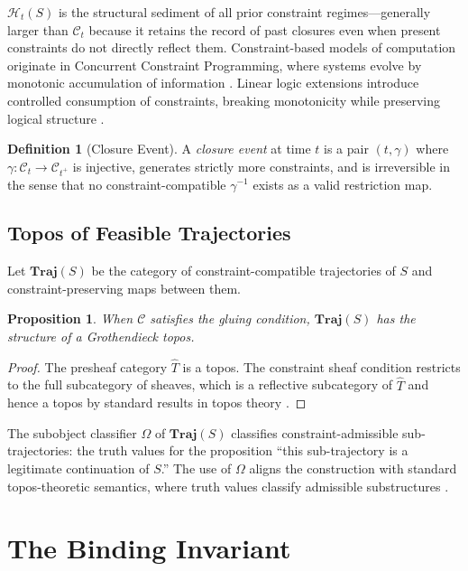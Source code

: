 \documentclass[11pt, letterpaper]{article}
\theoremstyle{plain}
\newtheorem{proposition}[theorem]{Proposition}
\theoremstyle{definition}
\newtheorem{definition}[theorem]{Definition}
\theoremstyle{remark}
\newcommand{\CC}{\mathcal{C}}
\newcommand{\HH}{\mathcal{H}}
\begin{document}
$\HH_t(S)$ is the structural sediment of all prior constraint regimes---generally
larger than $\CC_t$ because it retains the record of past closures even when present
constraints do not directly reflect them. Constraint-based models of computation
originate in Concurrent Constraint Programming, where systems evolve by monotonic
accumulation of information \cite{saraswat}. Linear logic extensions introduce
controlled consumption of constraints, breaking monotonicity while preserving logical
structure \cite{saraswatlincoln,girard}.

\begin{definition}[Closure Event]
A \emph{closure event} at time $t$ is a pair $(t, \gamma)$ where
$\gamma: \CC_t \to \CC_{t^+}$ is injective, generates strictly more constraints, and
is irreversible in the sense that no constraint-compatible $\gamma^{-1}$ exists as a
valid restriction map.
\end{definition}

\subsection{Topos of Feasible Trajectories}

Let $\mathbf{Traj}(S)$ be the category of constraint-compatible trajectories of $S$
and constraint-preserving maps between them.

\begin{proposition}
When $\CC$ satisfies the gluing condition, $\mathbf{Traj}(S)$ has the structure of a
Grothendieck topos.
\end{proposition}

\begin{proof}
The presheaf category $\widehat{T}$ is a topos. The constraint sheaf condition
restricts to the full subcategory of sheaves, which is a reflective subcategory of
$\widehat{T}$ and hence a topos by standard results in topos theory \cite{johnstone}.
\end{proof}

The subobject classifier $\Omega$ of $\mathbf{Traj}(S)$ classifies
constraint-admissible sub-trajectories: the truth values for the proposition ``this
sub-trajectory is a legitimate continuation of $S$.'' The use of $\Omega$ aligns the
construction with standard topos-theoretic semantics, where truth values classify
admissible substructures \cite{johnstone,maclane}.

\section{The Binding Invariant}
\end{document}
